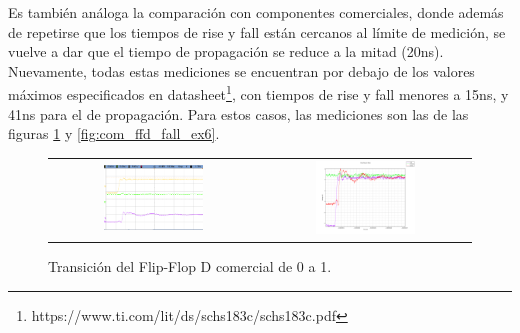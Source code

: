 Es también análoga la comparación con componentes comerciales, donde además de repetirse que los tiempos de rise y fall están cercanos al límite de medición, se vuelve a 
dar que el tiempo de propagación se reduce a la mitad (20ns).\\
Nuevamente, todas estas mediciones se encuentran por debajo de los valores máximos especificados en datasheet\footnote{https://www.ti.com/lit/ds/schs183c/schs183c.pdf},
con tiempos de rise y fall menores a 15ns, y 41ns para el de propagación.
Para estos casos, las mediciones son las de las figuras \ref{fig:com_ffd_rise_ex6} y \ref{fig:com_ffd_fall_ex6}.

\begin{figure}[H]
    \centering
    \begin{tabular}{c c}
        \includegraphics[width=0.5\textwidth]{../EJ6/Recursos/com_ffd_rise_osc} &
        \includegraphics[width=0.5\textwidth]{../EJ6/Recursos/com_ffd_rise}
    \end{tabular}
    \caption{Transición del Flip-Flop D comercial de 0 a 1.}
    \label{fig:com_ffd_rise_ex6}
\end{figure}


